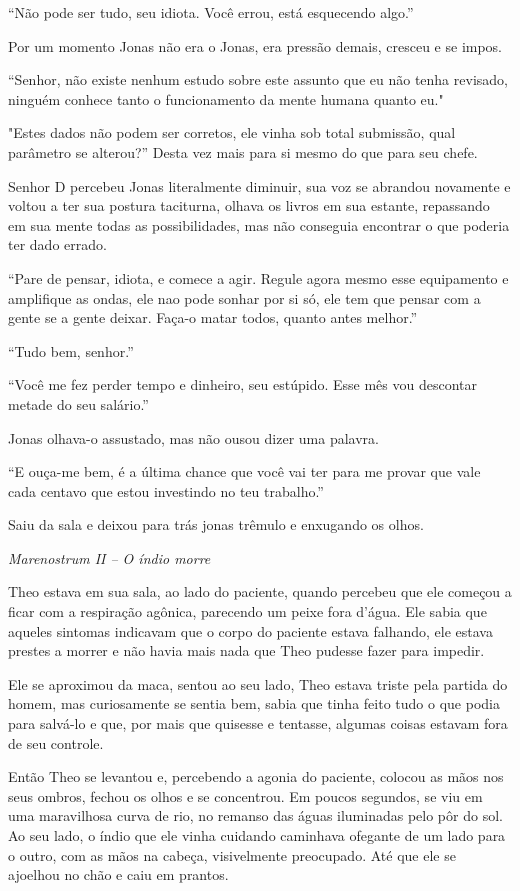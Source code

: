 ``Não pode ser tudo, seu idiota. Você errou, está esquecendo algo.''

Por um momento Jonas não era o Jonas, era pressão demais, cresceu e se
impos.

``Senhor, não existe nenhum estudo sobre este assunto que eu não tenha
revisado, ninguém conhece tanto o funcionamento da mente humana quanto
eu."

"Estes dados não podem ser corretos, ele vinha sob total submissão, qual
parâmetro se alterou?'' Desta vez mais para si mesmo do que para seu
chefe.

Senhor D percebeu Jonas literalmente diminuir, sua voz se abrandou
novamente e voltou a ter sua postura taciturna, olhava os livros em sua
estante, repassando em sua mente todas as possibilidades, mas não
conseguia encontrar o que poderia ter dado errado.

``Pare de pensar, idiota, e comece a agir. Regule agora mesmo esse
equipamento e amplifique as ondas, ele nao pode sonhar por si só, ele
tem que pensar com a gente se a gente deixar. Faça-o matar todos, quanto
antes melhor.''

``Tudo bem, senhor.''

``Você me fez perder tempo e dinheiro, seu estúpido. Esse mês vou
descontar metade do seu salário.''

Jonas olhava-o assustado, mas não ousou dizer uma palavra.

``E ouça-me bem, é a última chance que você vai ter para me provar que
vale cada centavo que estou investindo no teu trabalho.''

Saiu da sala e deixou para trás jonas trêmulo e enxugando os olhos.

\asterisc

\emph{Marenostrum II -- O índio morre}

Theo estava em sua sala, ao lado do paciente, quando percebeu que ele
começou a ficar com a respiração agônica, parecendo um peixe fora
d'água. Ele sabia que aqueles sintomas indicavam que o corpo do paciente
estava falhando, ele estava prestes a morrer e não havia mais nada que
Theo pudesse fazer para impedir.

Ele se aproximou da maca, sentou ao seu lado, Theo estava triste pela
partida do homem, mas curiosamente se sentia bem, sabia que tinha feito
tudo o que podia para salvá-lo e que, por mais que quisesse e tentasse,
algumas coisas estavam fora de seu controle.

Então Theo se levantou e, percebendo a agonia do paciente, colocou as
mãos nos seus ombros, fechou os olhos e se concentrou. Em poucos
segundos, se viu em uma maravilhosa curva de rio, no remanso das águas
iluminadas pelo pôr do sol. Ao seu lado, o índio que ele vinha cuidando
caminhava ofegante de um lado para o outro, com as mãos na cabeça,
visivelmente preocupado. Até que ele se ajoelhou no chão e caiu em
prantos.

